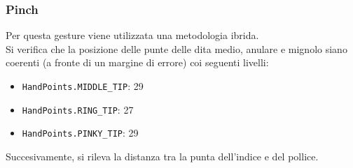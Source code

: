 \subsubsection{Pinch}
Per questa gesture viene utilizzata una metodologia ibrida.\\
Si verifica che la posizione delle punte delle dita medio, anulare e mignolo siano coerenti (a fronte di un margine di errore) coi seguenti livelli:
\begin{itemize}
    \item \texttt{HandPoints.MIDDLE\_TIP}: 29
    \item \texttt{HandPoints.RING\_TIP}: 27
    \item \texttt{HandPoints.PINKY\_TIP}: 29
\end{itemize} 
\noindent Succesivamente, si rileva la distanza tra la punta dell'indice e del pollice.

